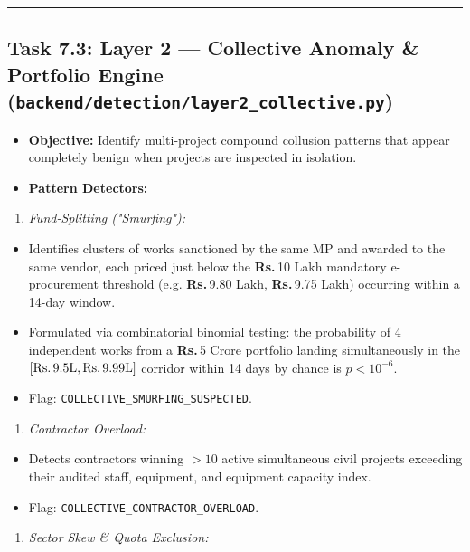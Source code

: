 \documentclass[11pt,a4paper]{article}
\DeclareRobustCommand{\INR}{\textbf{Rs.\,}}
\DeclareRobustCommand{\INR}{₹}
\begin{document}
\vspace{1em}\hrule\vspace{1em}

\subsection{Task 7.3: Layer 2 --- Collective Anomaly \& Portfolio Engine (\texttt{backend/detection/layer2\_collective.py})}
\begin{itemize}[leftmargin=1.5em, itemsep=2pt, topsep=3pt]
\item \textbf{Objective:} Identify multi-project compound collusion patterns that appear completely benign when projects are inspected in isolation.
\item \textbf{Pattern Detectors:}
\end{itemize}
\begin{enumerate}[leftmargin=1.5em, itemsep=2pt, topsep=3pt]
\item \textit{Fund-Splitting ("Smurfing"):}
\end{enumerate}
\begin{itemize}[leftmargin=1.5em, itemsep=2pt, topsep=3pt]
\item Identifies clusters of works sanctioned by the same MP and awarded to the same vendor, each priced just below the \INR{}10 Lakh mandatory e-procurement threshold (e.g. \INR{}9.80 Lakh, \INR{}9.75 Lakh) occurring within a 14-day window.
\item Formulated via combinatorial binomial testing: the probability of 4 independent works from a \INR{}5 Crore portfolio landing simultaneously in the $[\text{Rs.\,}9.5\text{L}, \text{Rs.\,}9.99\text{L}]$ corridor within 14 days by chance is $p < 10^{-6}$.
\item Flag: \texttt{COLLECTIVE\_SMURFING\_SUSPECTED}.
\end{itemize}
\begin{enumerate}[leftmargin=1.5em, itemsep=2pt, topsep=3pt]
\item \textit{Contractor Overload:}
\end{enumerate}
\begin{itemize}[leftmargin=1.5em, itemsep=2pt, topsep=3pt]
\item Detects contractors winning $> 10$ active simultaneous civil projects exceeding their audited staff, equipment, and equipment capacity index.
\item Flag: \texttt{COLLECTIVE\_CONTRACTOR\_OVERLOAD}.
\end{itemize}
\begin{enumerate}[leftmargin=1.5em, itemsep=2pt, topsep=3pt]
\item \textit{Sector Skew \& Quota Exclusion:}
\end{enumerate}
\end{document}
